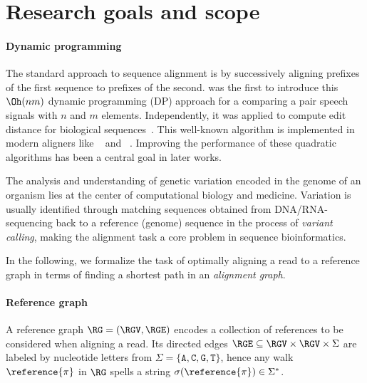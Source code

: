 \section{Research goals and scope}

\paragraph{Dynamic programming} The standard approach to sequence alignment is
by successively aligning prefixes of the first sequence to prefixes of the
second. \citet{vintsyuk1968speech} was the first to introduce this $\Oh(nm)$
dynamic programming (DP) approach for a comparing a pair speech signals with $n$
and $m$ elements. Independently, it was applied to compute edit distance for
biological
sequences~\citep{needleman1970general,sankoff1972matching,sellers1974theory,wagner1974string}.
This well-known algorithm is implemented in modern aligners  like
\seqan~\citep{reinert2017seqan} and \parasail~\citep{daily2016parasail}.
Improving the performance of these quadratic algorithms has been a central goal
in later works.





The analysis and understanding of genetic variation encoded in the genome of an
organism lies at the center of computational biology and medicine. Variation is
usually identified through matching sequences obtained from DNA/RNA-sequencing
back to a reference (genome) sequence in the process of \emph{variant calling},
making the alignment task a core problem in sequence bioinformatics.

%
In the following, we formalize the task of optimally aligning a read to a
reference graph in terms of finding a shortest path in an \emph{alignment
graph}.

\paragraph{Reference graph}
%
A reference graph $\RG=(\RGV,\RGE)$ encodes a collection of references to be
considered when aligning a read. Its directed edges $\RGE \subseteq \RGV \times
\RGV \times \Sigma$ are labeled by nucleotide letters from $\Sigma =
\{\texttt{A},\texttt{C},\texttt{G},\texttt{T}\}$, hence any walk
$\reference{\pi}$ in $\RG$ spells a string $\sigma(\reference{\pi}) \in
\Sigma^*$.

